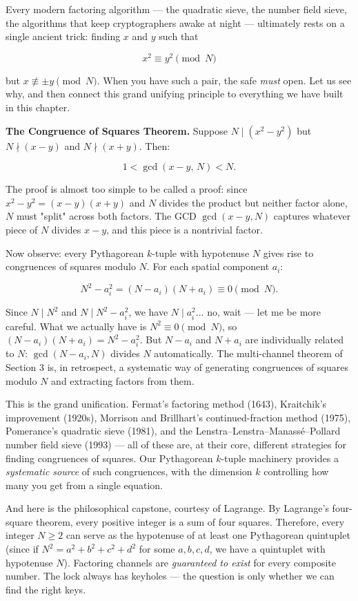 Every modern factoring algorithm --- the quadratic sieve, the number field sieve, the algorithms that keep cryptographers awake at night --- ultimately rests on a single ancient trick: finding $x$ and $y$ such that

\[
x^2 \equiv y^2 \pmod{N}
\]

but $x \not\equiv \pm y \pmod{N}$. When you have such a pair, the safe \textit{must} open. Let us see why, and then connect this grand unifying principle to everything we have built in this chapter.

\textbf{The Congruence of Squares Theorem.} Suppose $N \mid (x^2 - y^2)$ but $N \nmid (x - y)$ and $N \nmid (x + y)$. Then:

\[
1 < \gcd(x - y, \, N) < N.
\]

The proof is almost too simple to be called a proof: since $x^2 - y^2 = (x - y)(x + y)$ and $N$ divides the product but neither factor alone, $N$ must "split" across both factors. The GCD $\gcd(x - y, N)$ captures whatever piece of $N$ divides $x - y$, and this piece is a nontrivial factor.

Now observe: every Pythagorean $k$-tuple with hypotenuse $N$ gives rise to congruences of squares modulo $N$. For each spatial component $a_i$:

\[
N^2 - a_i^2 = (N - a_i)(N + a_i) \equiv 0 \pmod{N}.
\]

Since $N \mid N^2$ and $N \mid N^2 - a_i^2$, we have $N \mid a_i^2$... no, wait --- let me be more careful. What we actually have is $N^2 \equiv 0 \pmod{N}$, so $(N - a_i)(N + a_i) = N^2 - a_i^2$. But $N - a_i$ and $N + a_i$ are individually related to $N$: $\gcd(N - a_i, N)$ divides $N$ automatically. The multi-channel theorem of Section 3 is, in retrospect, a systematic way of generating congruences of squares modulo $N$ and extracting factors from them.

This is the grand unification. Fermat's factoring method (1643), Kraitchik's improvement (1920s), Morrison and Brillhart's continued-fraction method (1975), Pomerance's quadratic sieve (1981), and the Lenstra–Lenstra–Manassé–Pollard number field sieve (1993) --- all of these are, at their core, different strategies for finding congruences of squares. Our Pythagorean $k$-tuple machinery provides a \textit{systematic source} of such congruences, with the dimension $k$ controlling how many you get from a single equation.

And here is the philosophical capstone, courtesy of Lagrange. By Lagrange's four-square theorem, every positive integer is a sum of four squares. Therefore, every integer $N \geq 2$ can serve as the hypotenuse of at least one Pythagorean quintuplet (since if $N^2 = a^2 + b^2 + c^2 + d^2$ for some $a, b, c, d$, we have a quintuplet with hypotenuse $N$). Factoring channels are \textit{guaranteed to exist} for every composite number. The lock always has keyholes --- the question is only whether we can find the right keys.

